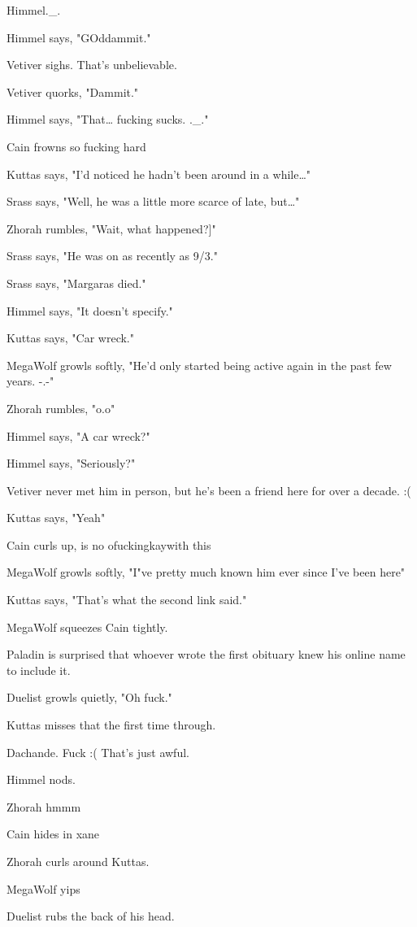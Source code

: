 \begin{hangparas}{2em}{1}
Himmel.\_.

Himmel says, "GOddammit."

Vetiver sighs. That's unbelievable.

Vetiver quorks, "Dammit."

Himmel says, "That\ldots{} fucking sucks. .\_."

Cain frowns so fucking hard

Kuttas says, "I'd noticed he hadn't been around in a while\ldots{}"

Srass says, "Well, he was a little more scarce of late, but\ldots{}"

Zhorah rumbles, "Wait, what happened?]"

Srass says, "He was on as recently as 9/3."

Srass says, "Margaras died."

Himmel says, "It doesn't specify."

Kuttas says, "Car wreck."

MegaWolf growls softly, "He'd only started being active again in the past few years. -.-"

Zhorah rumbles, "o.o"

Himmel says, "A car wreck?"

Himmel says, "Seriously?"

Vetiver never met him in person, but he's been a friend here for over a decade. :(

Kuttas says, "Yeah"

Cain curls up, is no ofuckingkaywith this

MegaWolf growls softly, "I"ve pretty much known him ever since I've been here"

Kuttas says, "That's what the second link said."

MegaWolf squeezes Cain tightly.

Paladin is surprised that whoever wrote the first obituary knew his online name to include it.

Duelist growls quietly, "Oh fuck."

Kuttas misses that the first time through.

Dachande. Fuck :( That's just awful.

Himmel nods.

Zhorah hmmm

Cain hides in xane

Zhorah curls around Kuttas.

MegaWolf yips

Duelist rubs the back of his head.


\end{hangparas}
